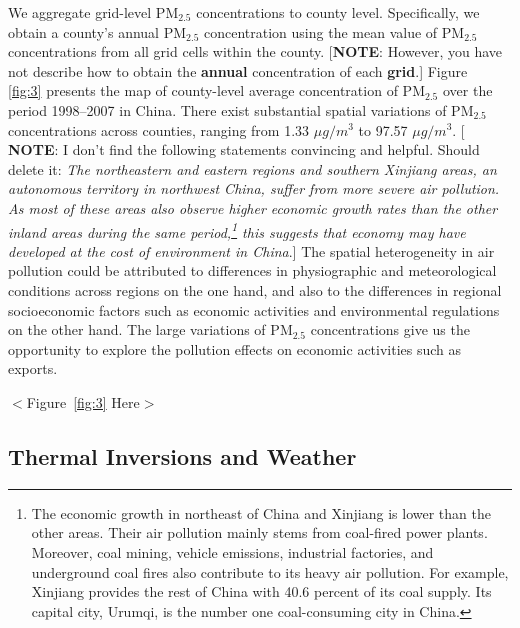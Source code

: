 \documentclass[12pt]{article}
\begin{document}
We aggregate grid-level $\mathrm{PM_{2.5}}$ concentrations to county level.
Specifically, we obtain a county's annual $\mathrm{PM_{2.5}}$ concentration
using the mean value of $\mathrm{PM_{2.5}}$ concentrations from all grid
cells within the county. [\textbf{NOTE}: However, you have not describe how
to obtain the \textbf{annual} concentration of each \textbf{grid}.] Figure~%
\ref{fig:3} presents the map of county-level average concentration of $%
\mathrm{PM_{2.5}}$ over the period 1998--2007 in China. There exist
substantial spatial variations of $\mathrm{PM_{2.5}}$ concentrations across
counties, ranging from 1.33 $\mu g/m^{3}$ to 97.57 $\mu g/m^{3}$. [\textbf{%
NOTE}: I don't find the following statements convincing and helpful. Should
delete it: \emph{The northeastern and eastern regions and southern Xinjiang
areas, an autonomous territory in northwest China, suffer from more severe
air pollution. As most of these areas also observe higher economic growth
rates than the other inland areas during the same period,\footnote{%
The economic growth in northeast of China and Xinjiang is lower than the
other areas. Their air pollution mainly stems from coal-fired power plants.
Moreover, coal mining, vehicle emissions, industrial factories, and
underground coal fires also contribute to its heavy air pollution. For
example, Xinjiang provides the rest of China with 40.6 percent of its coal
supply. Its capital city, Urumqi, is the number one coal-consuming city in
China.} this suggests that economy may have developed at the cost of
environment in China}.] The spatial heterogeneity in air pollution could be
attributed to differences in physiographic and meteorological conditions
across regions on the one hand, and also to the differences in regional
socioeconomic factors such as economic activities and environmental
regulations on the other hand. The large variations of $\mathrm{PM_{2.5}}$
concentrations give us the opportunity to explore the pollution effects on
economic activities such as exports. 

\begin{center}
$<$Figure~\ref{fig:3} Here$>$
\end{center}

\subsection{Thermal Inversions and Weather}
\end{document}
